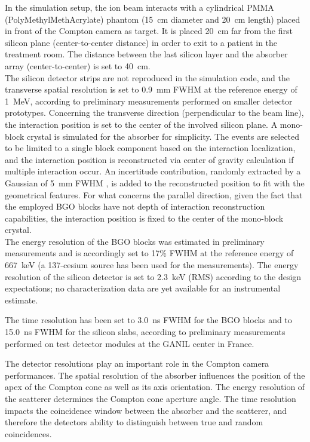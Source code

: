 In the simulation setup, the ion beam interacts with a cylindrical PMMA (PolyMethylMethAcrylate) phantom (15~cm diameter and 20~cm length) placed in front of the Compton camera as target. It is placed 20~cm far from the first silicon plane (center-to-center distance) in order to exit to a patient in the treatment room. The distance between the last silicon layer and the absorber array (center-to-center) is set to 40~cm.\\
The silicon detector strips are not reproduced in the simulation code, and the transverse spatial resolution is set to 0.9~mm FWHM at the reference energy of 1~MeV, according to preliminary measurements performed on smaller detector prototypes. Concerning the transverse direction (perpendicular to the beam line), the interaction position is set to the center of the involved silicon plane. A mono-block crystal is simulated for the absorber for simplicity. The events are selected to be limited to a single block component based on the interaction localization, and the interaction position is reconstructed via center of gravity calculation if multiple interaction occur. An incertitude contribution, randomly extracted by a Gaussian of 5~mm FWHM , is added to the reconstructed position to fit with the geometrical features. For what concerns the parallel direction, given the fact that the employed BGO blocks have not depth of interaction reconstruction capabilities, the interaction position is fixed to the center of the mono-block crystal.\\
The energy resolution of the BGO blocks was estimated in preliminary measurements and is accordingly set to 17\% FWHM at the reference energy of 667~keV (a 137-cesium source has been used for the measurements). The energy resolution of the silicon detector is set to 2.3~keV (RMS) according to the design expectations; no characterization data are yet available for an instrumental estimate.

The time resolution has been set to 3.0~ns FWHM for the BGO blocks and to 15.0~ns FWHM for the silicon slabs, according to preliminary measurements performed on test detector modules at the GANIL %
center in France.

The detector resolutions play an important role in the Compton camera performances. The spatial resolution of the absorber influences the position of the apex of the Compton cone as well as its axis orientation. The energy resolution of the scatterer determines the Compton cone aperture angle. The time resolution impacts the coincidence window between the absorber and the scatterer, and therefore the detectors ability to distinguish between true and random coincidences.

